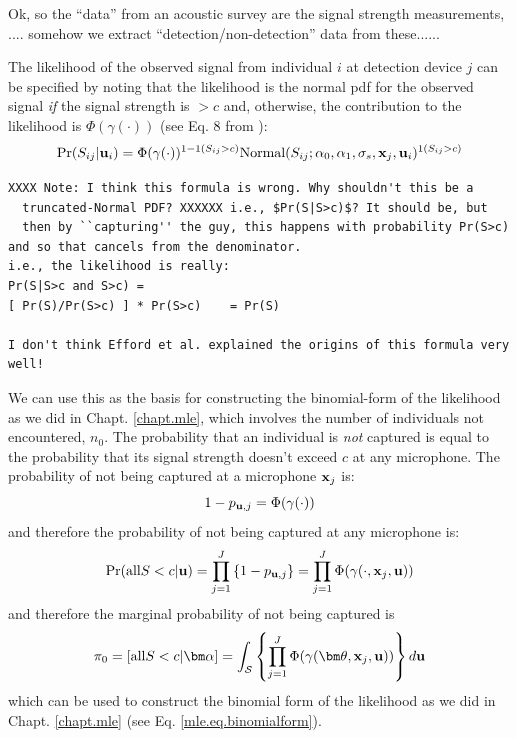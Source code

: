Ok, so the ``data'' from an acoustic survey are the signal strength
measurements, .... somehow we extract ``detection/non-detection'' data
from these...... 

The likelihood of the observed signal from individual $i$ at detection
device $j$ can be specified by noting that
the 
likelihood is the normal pdf for the observed signal {\it if} the
signal strength is $>c$ and, otherwise, the contribution to the
likelihood is $\Phi(\gamma(\cdot))$ (see Eq. 8 from \citet{efford_etal:2009ecol}):
\[
\Pr(S_{ij}| {\bf u}_{i} ) = \Phi( \gamma( \cdot) )^{1-1(S_{ij}>c)}
\mbox{Normal}(S_{ij};\alpha_{0},\alpha_{1},\sigma_{s},{\bf x}_{j},{\bf
u}_{i})^{1(S_{ij}>c)}
\]
\begin{verbatim}
XXXX Note: I think this formula is wrong. Why shouldn't this be a
  truncated-Normal PDF? XXXXXX i.e., $Pr(S|S>c)$? It should be, but
  then by ``capturing'' the guy, this happens with probability Pr(S>c)
and so that cancels from the denominator. 
i.e., the likelihood is really:
Pr(S|S>c and S>c) =
[ Pr(S)/Pr(S>c) ] * Pr(S>c)    = Pr(S)

I don't think Efford et al. explained the origins of this formula very well!
\end{verbatim}

We can use this as the basis for constructing the binomial-form of the
likelihood as we did in Chapt. \ref{chapt.mle}, which involves the
number of individuals not encountered, $n_{0}$.
The probability that an individual is {\it not} captured is equal to
the probability that its signal strength doesn't exceed $c$ at any
microphone.
The probability of not being captured at a microphone ${\bf x}_{j}$ is:
\[
1-p_{{\bf u},j} = \Phi( \gamma(\cdot) ) 
\]
and therefore the probability of not being captured at any microphone is:
\[
\Pr(\mbox{all} S < c | {\bf u}) = \prod_{j=1}^{J} \left\{ 1-p_{{\bf u},j} \right\} =
\prod_{j=1}^{J} \Phi( \gamma(\cdot, {\bf x}_{j}, {\bf u}) ) 
\]
and therefore the marginal probability of not being captured is
\[
\pi_{0} = [ \mbox{all}  S < c | {\bm \alpha}] = 
\int_{{\cal S}} 
 \left\{
\prod_{j=1}^{J} \Phi( \gamma( {\bm \theta}, {\bf x}_{j}, {\bf u}) )  
 \right\}
 d{\bf u}
\]
which can be used to construct the binomial form of the likelihood as
we did in Chapt. \ref{chapt.mle} (see Eq. \ref{mle.eq.binomialform}).

